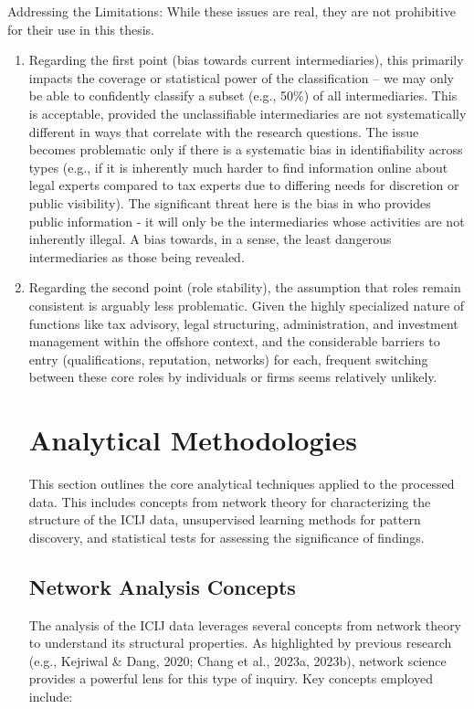 Addressing the Limitations: While these issues are real, they are not prohibitive for their use in this thesis.
\begin{enumerate}
    \item Regarding the first point (bias towards current intermediaries), this primarily impacts the coverage or statistical power of the classification – we may only be able to confidently classify a subset (e.g., 50\%) of all intermediaries. This is acceptable, provided the unclassifiable intermediaries are not systematically different in ways that correlate with the research questions. The issue becomes problematic only if there is a systematic bias in identifiability across types (e.g., if it is inherently much harder to find information online about legal experts compared to tax experts due to differing needs for discretion or public visibility). The significant threat here is the bias in who provides public information - it will only be the intermediaries whose activities are not inherently illegal. A bias towards, in a sense, the least dangerous intermediaries as those being revealed.
    \item Regarding the second point (role stability), the assumption that roles remain consistent is arguably less problematic. Given the highly specialized nature of functions like tax advisory, legal structuring, administration, and investment management within the offshore context, and the considerable barriers to entry (qualifications, reputation, networks) for each, frequent switching between these core roles by individuals or firms seems relatively unlikely.

\section{Analytical Methodologies}
\label{sec:3_3_analytical_methodologies}

This section outlines the core analytical techniques applied to the processed data. This includes concepts from network theory for characterizing the structure of the ICIJ data, unsupervised learning methods for pattern discovery, and statistical tests for assessing the significance of findings.

\subsection{Network Analysis Concepts}
\label{subsec:network_theory_concepts}

The analysis of the ICIJ data leverages several concepts from network theory to understand its structural properties. As highlighted by previous research (e.g., Kejriwal \& Dang, 2020; Chang et al., 2023a, 2023b), network science provides a powerful lens for this type of inquiry. Key concepts employed include:


\end{enumerate}
